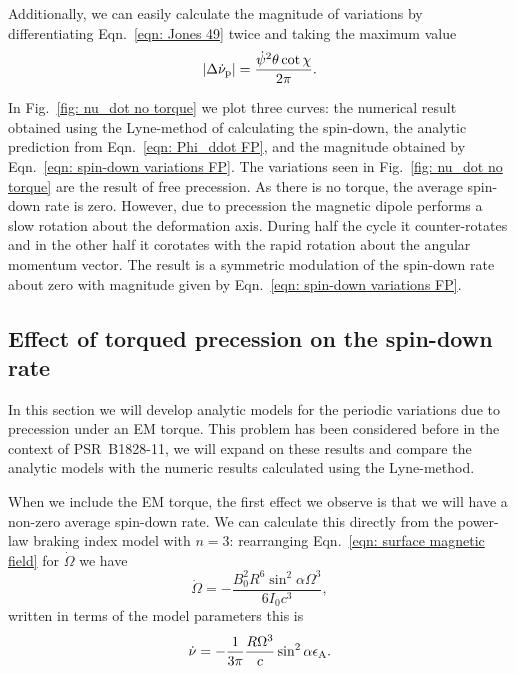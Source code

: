 \documentclass[../full_thesis/full_thesis.tex]{subfiles}
\begin{document}
Additionally, we can easily calculate the  magnitude of variations by
differentiating Eqn.~\eqref{eqn: Jones 49} twice and taking the maximum value
\begin{equation}
    |\Delta\dot{\nu}_{\mathrm{p}}| =\frac{\dot{\psi}^{2} \theta \cot\chi}{2\pi}.
    \label{eqn: spin-down variations FP}
\end{equation}

In Fig.~\ref{fig: nu_dot no torque} we plot three curves: the numerical
result obtained using the Lyne-method of calculating the spin-down, the analytic
prediction from Eqn.~\eqref{eqn: Phi_ddot FP}, and the magnitude obtained by
Eqn.~\eqref{eqn: spin-down variations FP}.
The variations seen in Fig.~\ref{fig: nu_dot no torque} are the result of
free precession. As there is no torque, the average spin-down rate is zero. However,
due to precession the magnetic dipole performs a slow rotation about the
deformation axis. During half the cycle it counter-rotates and in the other
half it corotates with the rapid rotation about the angular momentum vector.
The result is a symmetric modulation of the spin-down rate about zero with magnitude
given by Eqn.~\eqref{eqn: spin-down variations FP}.

\subsection{Effect of torqued precession on the spin-down rate}
In this section we will develop analytic models for the periodic variations due
to precession under an EM torque. This problem has been considered before in
the context of PSR~B1828-11, we will expand on these results and compare the
analytic models with the numeric results calculated using the Lyne-method.

When we include the EM torque, the first effect we observe is that we will have
a non-zero average spin-down rate.  We can calculate this directly from the
power-law braking index model with $n=3$: rearranging Eqn.~\eqref{eqn: surface
magnetic field} for $\dot{\Omega}$ we have
\begin{equation}
    \dot{\Omega} = -\frac{B_{0}^{2}R^{6} \sin^{2}\alpha \Omega^{3}}{6I_{0}c^{3}},
\end{equation}
written in terms of the model parameters this is
\begin{equation}
\dot{\nu} = -\frac{1}{3\pi}\frac{R \Omega^{3}}{c} \sin^{2}\alpha \epsilon_{\mathrm{A}}.
\end{equation}
\end{document}
